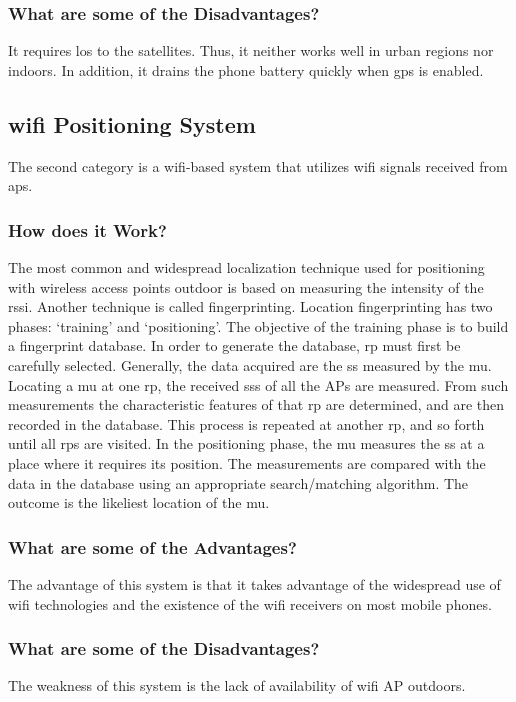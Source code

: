 \subsubsection{What are some of the Disadvantages?}
It requires \ac{los} to the satellites.
Thus, it neither works well in urban regions nor indoors.
In addition, it drains the phone battery quickly when \ac{gps} is enabled.\cite{8886005}

\subsection{\ac{wifi} Positioning System}
The second category is a \ac{wifi}-based system that utilizes \ac{wifi} signals received from \ac{aps}.

\subsubsection{How does it Work?}
The most common and widespread localization technique used for positioning with wireless access points  outdoor is based on measuring the intensity of the \ac{rssi}.
Another technique is called fingerprinting.
Location fingerprinting has two phases: `training' and `positioning'.
The objective of the training phase is to build a fingerprint database.
In order to generate the database, \ac{rp} must first be carefully selected.
Generally, the data acquired are the \ac{ss} measured by the \ac{mu}.
Locating a \ac{mu} at one \ac{rp}, the received \ac{ss}s of all the APs are measured.
From such measurements the characteristic features of that \ac{rp} are determined, and are then recorded in the database.
This process is repeated at another \ac{rp}, and so forth until all \ac{rp}s are visited.
In the positioning phase, the \ac{mu} measures the \ac{ss} at a place where it requires its position.
The measurements are compared with the data in the database using an appropriate search/matching algorithm.
The outcome is the likeliest location of the \ac{mu}.\cite{wifi}

\subsubsection{What are some of the Advantages?}
The advantage of this system is that it takes advantage of the widespread use of \ac{wifi} technologies and the existence of the \ac{wifi} receivers on most mobile phones.

\subsubsection{What are some of the Disadvantages?}
The weakness of this system is the lack of availability of \ac{wifi} AP outdoors.

